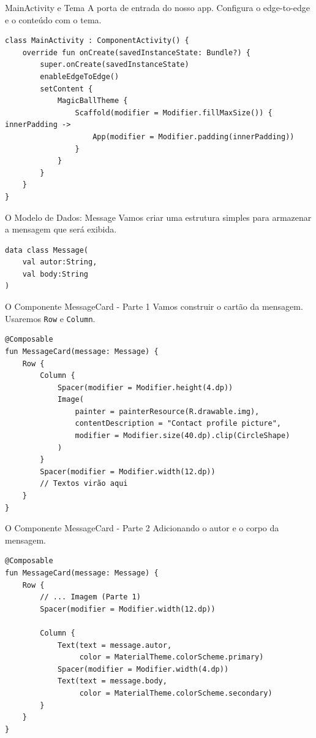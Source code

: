 \documentclass[aspectratio=169]{beamer}
\begin{document}
\begin{frame}[fragile]{MainActivity e Tema}
  A porta de entrada do nosso app. Configura o edge-to-edge e o conteúdo com o tema.
  \begin{lstlisting}[style=KotlinStyle]
class MainActivity : ComponentActivity() {
    override fun onCreate(savedInstanceState: Bundle?) {
        super.onCreate(savedInstanceState)
        enableEdgeToEdge()
        setContent {
            MagicBallTheme {
                Scaffold(modifier = Modifier.fillMaxSize()) { innerPadding ->
                    App(modifier = Modifier.padding(innerPadding))
                }
            }
        }
    }
}
  \end{lstlisting}
\end{frame}

\begin{frame}[fragile]{O Modelo de Dados: Message}
  Vamos criar uma estrutura simples para armazenar a mensagem que será exibida.
  \begin{lstlisting}[style=KotlinStyle]
data class Message(
    val autor:String,
    val body:String
)
  \end{lstlisting}
\end{frame}

\begin{frame}[fragile]{O Componente MessageCard - Parte 1}
  Vamos construir o cartão da mensagem. Usaremos \texttt{Row} e \texttt{Column}.
  \begin{lstlisting}[style=KotlinStyle]
@Composable
fun MessageCard(message: Message) {
    Row {
        Column {
            Spacer(modifier = Modifier.height(4.dp))
            Image(
                painter = painterResource(R.drawable.img),
                contentDescription = "Contact profile picture",
                modifier = Modifier.size(40.dp).clip(CircleShape)
            )
        }
        Spacer(modifier = Modifier.width(12.dp))
        // Textos virão aqui
    }
}
  \end{lstlisting}
\end{frame}

\begin{frame}[fragile]{O Componente MessageCard - Parte 2}
  Adicionando o autor e o corpo da mensagem.
  \begin{lstlisting}[style=KotlinStyle]
@Composable
fun MessageCard(message: Message) {
    Row {
        // ... Imagem (Parte 1)
        Spacer(modifier = Modifier.width(12.dp))
        
        Column {
            Text(text = message.autor, 
                 color = MaterialTheme.colorScheme.primary)
            Spacer(modifier = Modifier.width(4.dp))
            Text(text = message.body, 
                 color = MaterialTheme.colorScheme.secondary)
        }
    }
}
  \end{lstlisting}
\end{frame}
\end{document}
